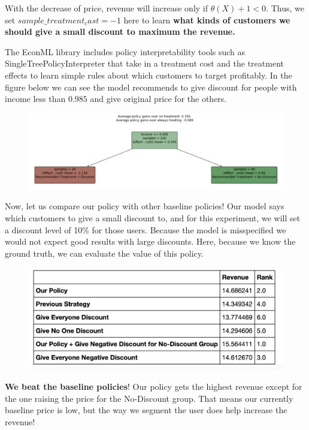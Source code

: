 \documentclass[12pt]{article}
\begin{document}
With the decrease of price, revenue will increase only if $\theta(X)+1 < 0$. Thus, we set $sample\_treatment_cast=-1$ here to learn \textbf{what kinds of customers we should give a small discount to maximum the revenue.}

The EconML library includes policy interpretability tools such as SingleTreePolicyInterpreter that take in a treatment cost and the treatment effects to learn simple rules about which customers to target profitably. In the figure below we can see the model recommends to give discount for people with income less than $0.985$ and give original price for the others.

\begin{figure}[H]
    \centering
    \includegraphics[width=.6\textwidth]{fig/Casual_Inference_Microsoft_Example_7.png}
\end{figure}

Now, let us compare our policy with other baseline policies! Our model says which customers to give a small discount to, and for this experiment, we will set a discount level of 10\% for those users. Because the model is misspecified we would not expect good results with large discounts. Here, because we know the ground truth, we can evaluate the value of this policy.
\begin{figure}[H]
    \centering
    \includegraphics[width=1\textwidth]{fig/Casual_Inference_Microsoft_Example_8.png}
\end{figure}

\textbf{We beat the baseline policies}! Our policy gets the highest revenue except for the one raising the price for the No-Discount group. That means our currently baseline price is low, but the way we segment the user does help increase the revenue!



\end{document}
